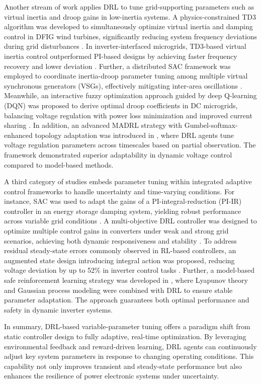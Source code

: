 Another stream of work applies DRL to tune grid-supporting parameters such as virtual inertia and droop gains in low-inertia systems. A physics-constrained TD3 algorithm was developed to simultaneously optimize virtual inertia and damping control in DFIG wind turbines, significantly reducing system frequency deviations during grid disturbances \cite{egbomwan2024physics}. In inverter-interfaced microgrids, TD3-based virtual inertia control outperformed PI-based designs by achieving faster frequency recovery and lower deviation \cite{egbomwan2022twin}. Further, a distributed SAC framework was employed to coordinate inertia-droop parameter tuning among multiple virtual synchronous generators (VSGs), effectively mitigating inter-area oscillations \cite{yang2022distributed}. Meanwhile, an interactive fuzzy optimization approach guided by deep Q-learning (DQN) was proposed to derive optimal droop coefficients in DC microgrids, balancing voltage regulation with power loss minimization and improved current sharing \cite{thanh2022improving}. In addition, an advanced MADRL strategy with Gumbel-softmax-enhanced topology adaptation was introduced in \cite{wu2023multi}, where DRL agents tune voltage regulation parameters across timescales based on partial observation. The framework demonstrated superior adaptability in dynamic voltage control compared to model-based methods.

A third category of studies embeds parameter tuning within integrated adaptive control frameworks to handle uncertainty and time-varying conditions. For instance, SAC was used to adapt the gains of a PI-integral-reduction (PI-IR) controller in an energy storage damping system, yielding robust performance across variable grid conditions \cite{li2021mechanism}. A multi-objective DRL controller was designed to optimize multiple control gains in converters under weak and strong grid scenarios, achieving both dynamic responsiveness and stability \cite{jiang2023stability}. To address residual steady-state errors commonly observed in RL-based controllers, an augmented state design introducing integral action was proposed, reducing voltage deviation by up to 52\% in inverter control tasks \cite{weber2023steady}. Further, a model-based safe reinforcement learning strategy was developed in \cite{shuai2024safe}, where Lyapunov theory and Gaussian process modeling were combined with DRL to ensure stable parameter adaptation. The approach guarantees both optimal performance and safety in dynamic inverter systems.

In summary, DRL-based variable-parameter tuning offers a paradigm shift from static controller design to fully adaptive, real-time optimization. By leveraging environmental feedback and reward-driven learning, DRL agents can continuously adjust key system parameters in response to changing operating conditions. This capability not only improves transient and steady-state performance but also enhances the resilience of power electronic systems under uncertainty.

